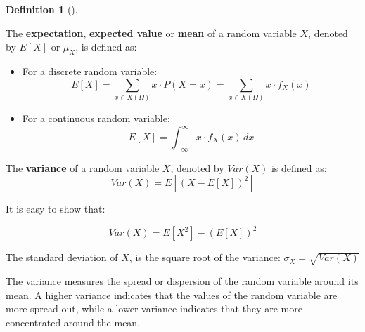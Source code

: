 \documentclass[
  letterpaper,
  DIV=11,
  numbers=noendperiod]{scrreport}
\providecommand{\tightlist}{%
  \setlength{\itemsep}{0pt}\setlength{\parskip}{0pt}}
\theoremstyle{definition}
\theoremstyle{plain}
\theoremstyle{definition}
\newtheorem{definition}{Definition}[chapter]
\theoremstyle{plain}
\theoremstyle{remark}
\begin{document}
\begin{tcolorbox}[enhanced jigsaw, breakable, opacityback=0, leftrule=.75mm, colback=white, bottomtitle=1mm, coltitle=black, toptitle=1mm, titlerule=0mm, bottomrule=.15mm, colframe=quarto-callout-note-color-frame, title={EXpectation and Variance of a Random Variable}, opacitybacktitle=0.6, colbacktitle=quarto-callout-note-color!10!white, rightrule=.15mm, arc=.35mm, toprule=.15mm, left=2mm]

\begin{definition}[]\protect\hypertarget{def-expectation-variance}{}\label{def-expectation-variance}

The \textbf{expectation}, \textbf{expected value} or \textbf{mean} of a
random variable \(X\), denoted by \(E[X]\) or \(\mu_X\), is defined as:

\begin{itemize}
\tightlist
\item
  For a discrete random variable:
  \[ E[X] = \sum_{x \in X(\Omega)} x \cdot P(X = x) = \sum_{x \in X(\Omega)} x \cdot f_X(x) \]
\item
  For a continuous random variable:
  \[ E[X] = \int_{-\infty}^{\infty} x \cdot f_X(x) \, dx \]
\end{itemize}

The \textbf{variance} of a random variable \(X\), denoted by \(Var(X)\)
is defined as: \[
 Var(X) = E[(X - E[X])^2] 
\]

It is easy to show that:

\[
Var(X) = E[X^2] - (E[X])^2
\]

The standard deviation of \(X\), is the square root of the variance:
\(\sigma_X = \sqrt{Var(X)}\)

\end{definition}

\end{tcolorbox}

The variance measures the spread or dispersion of the random variable
around its mean. A higher variance indicates that the values of the
random variable are more spread out, while a lower variance indicates
that they are more concentrated around the mean.
\end{document}
